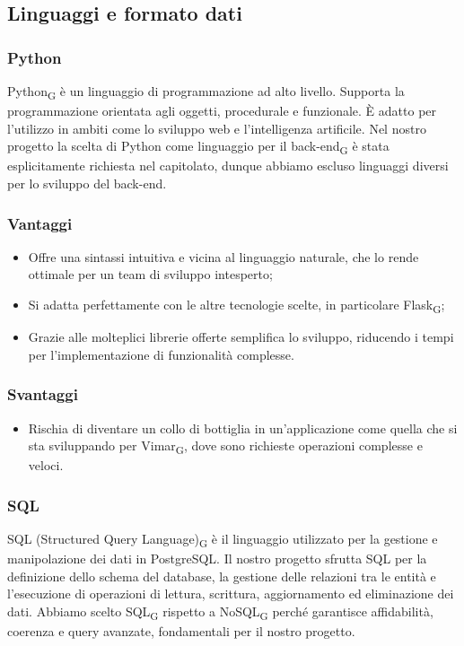 \subsection{Linguaggi e formato dati}
\subsubsection{Python}
Python\textsubscript{G} è un linguaggio di programmazione ad alto livello. Supporta la programmazione orientata agli oggetti, procedurale e funzionale. È adatto per l'utilizzo in ambiti come lo sviluppo web e l'intelligenza artificile. Nel nostro progetto la scelta di Python come linguaggio per il back-end\textsubscript{G} è stata esplicitamente richiesta nel capitolato, dunque abbiamo escluso linguaggi diversi per lo sviluppo del back-end. 
\subsubsection{Vantaggi}
\begin{itemize}
    \item Offre una sintassi intuitiva e vicina al linguaggio naturale, che lo rende ottimale per un team di sviluppo intesperto;
    \item Si adatta perfettamente con le altre tecnologie scelte, in particolare Flask\textsubscript{G};
    \item Grazie alle molteplici librerie offerte semplifica lo sviluppo, riducendo i tempi per l'implementazione di funzionalità complesse.
\end{itemize}
\subsubsection{Svantaggi}
\begin{itemize}
    \item Rischia di diventare un collo di bottiglia in un'applicazione come quella che si sta sviluppando per Vimar\textsubscript{G}, dove sono richieste operazioni complesse e veloci.
\end{itemize}

\subsubsection{SQL}
SQL (Structured Query Language)\textsubscript{G} è il linguaggio utilizzato per la gestione e manipolazione dei dati in PostgreSQL. Il nostro progetto sfrutta SQL per la definizione dello schema del database, la gestione delle relazioni tra le entità e l’esecuzione di operazioni di lettura, scrittura, aggiornamento ed eliminazione dei dati. Abbiamo scelto SQL\textsubscript{G} rispetto a NoSQL\textsubscript{G} perché garantisce affidabilità, coerenza e query avanzate, fondamentali per il nostro progetto.
